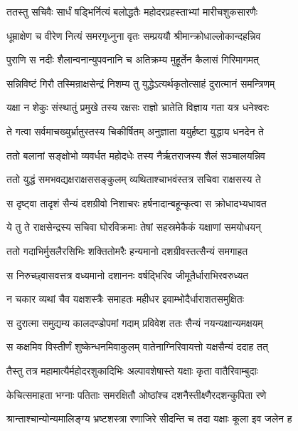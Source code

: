 
\twolineshloka
{ततस्तु सचिवैः सार्धं षड्भिर्नित्यं बलोद्धतैः}
{महोदरप्रहस्ताभ्यां मारीचशुकसारणैः} %

\twolineshloka
{धूम्राक्षेण च वीरेण नित्यं समरगृध्नुना}
{वृतः सम्प्रययौ श्रीमान्क्रोधाल्लोकान्दहन्निव} %

\twolineshloka
{पुराणि स नदीः शैलान्वनान्युपवनानि च}
{अतिक्रम्य मुहूर्तेन कैलासं गिरिमागमत्} %

\twolineshloka
{सन्निविष्टं गिरौ तस्मिन्राक्षसेन्द्रं निशम्य तु}
{युद्धेऽत्यर्थकृतोत्साहं दुरात्मानं समन्त्रिणम्} %

\twolineshloka
{यक्षा न शेकुः संस्थातुं प्रमुखे तस्य रक्षसः}
{राज्ञो भ्रातेति विज्ञाय गता यत्र धनेश्वरः} %

\twolineshloka
{ते गत्वा सर्वमाचख्युर्भ्रातुस्तस्य चिकीर्षितम्}
{अनुज्ञाता ययुर्हष्टा युद्धाय धनदेन ते} %

\twolineshloka
{ततो बलानां सङ्क्षोभो व्यवर्धत महोदधेः}
{तस्य नैर्ऋतराजस्य शैलं सञ्चालयन्निव} %

\twolineshloka
{ततो युद्धं समभवद्यक्षराक्षससङ्कुलम्}
{व्यथिताश्चाभवंस्तत्र सचिवा राक्षसस्य ते} %

\twolineshloka
{स दृष्ट्वा तादृशं सैन्यं दशग्रीवो निशाचरः}
{हर्षनादान्बहून्कृत्वा स क्रोधादभ्यधावत} %

\twolineshloka
{ये तु ते राक्षसेन्द्रस्य सचिवा घोरविक्रमाः}
{तेषां सहस्रमेकैकं यक्षाणां समयोधयन्} %

\twolineshloka
{ततो गदाभिर्मुसलैरसिभिः शक्तितोमरैः}
{हन्यमानो दशग्रीवस्तत्सैन्यं समगाहत} %

\twolineshloka
{स निरुच्छ्वासवत्तत्र वध्यमानो दशाननः}
{वर्षद्भिरिव जीमूतैर्धाराभिरवरुध्यत} %

\twolineshloka
{न चकार व्यथां चैव यक्षशस्त्रैः समाहतः}
{महीधर इवाम्भोदैर्धाराशतसमुक्षितः} %

\twolineshloka
{स दुरात्मा समुद्यम्य कालदण्डोपमां गदाम्}
{प्रविवेश ततः सैन्यं नयन्यक्षान्यमक्षयम्} %

\twolineshloka
{स कक्षमिव विस्तीर्णं शुष्केन्धनमिवाकुलम्}
{वातेनाग्निरिवायत्तो यक्षसैन्यं ददाह तत्} %

\twolineshloka
{तैस्तु तत्र महामात्यैर्महोदरशुकादिभिः}
{अल्पावशेषास्ते यक्षाः कृता वातैरिवाम्बुदाः} %

\twolineshloka
{केचित्समाहता भग्नाः पतिताः समरक्षितौ}
{ओष्ठांश्च दशनैस्तीक्ष्णैरदशन्कुपिता रणे} %

\twolineshloka
{श्रान्ताश्चान्योन्यमालिङ्ग्य भ्रष्टशस्त्रा रणाजिरे}
{सीदन्ति च तदा यक्षाः कूला इव जलेन ह} %

